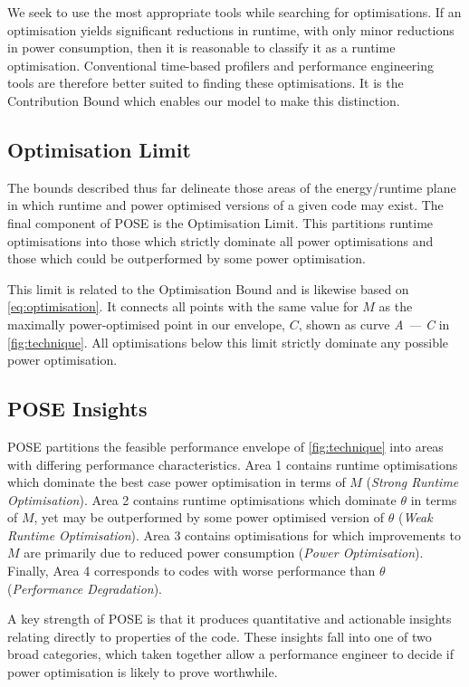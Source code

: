 We seek to use the most appropriate tools while searching for optimisations.
If an optimisation yields significant reductions in runtime, with only minor reductions in power consumption, then it is reasonable to classify it as a runtime optimisation.
Conventional time-based profilers and performance engineering tools are therefore better suited to finding these optimisations.
It is the Contribution Bound which enables our model to make this distinction.

\subsection{Optimisation Limit}
\noindent
The bounds described thus far delineate those areas of the energy/runtime plane in which runtime and power optimised versions of a given code may exist.
The final component of POSE is the Optimisation Limit.
This partitions runtime optimisations into those which strictly dominate all power optimisations and those which could be outperformed by some power optimisation.

This limit is related to the Optimisation Bound and is likewise based on \autoref{eq:optimisation}.
It connects all points with the same value for $M$ as the maximally power-optimised point in our envelope, $C$, shown as curve \emph{A --- C} in \autoref{fig:technique}.
All optimisations below this limit strictly dominate any possible power optimisation.

\subsection{POSE Insights}
\noindent

POSE partitions the feasible performance envelope of \autoref{fig:technique} into areas with differing performance characteristics.
Area 1 contains runtime optimisations which dominate the best case power optimisation in terms of $M$ (\emph{Strong Runtime Optimisation}).
Area 2 contains runtime optimisations which dominate $\theta$ in terms of $M$, yet may be outperformed by some power optimised version of $\theta$ (\emph{Weak Runtime Optimisation}).
Area 3 contains optimisations for which improvements to $M$ are primarily due to reduced power consumption (\emph{Power Optimisation}).
Finally, Area 4 corresponds to codes with worse performance than $\theta$ (\emph{Performance Degradation}).

A key strength of POSE is that it produces quantitative and actionable insights relating directly to properties of the code.
These insights fall into one of two broad categories, which taken together allow a performance engineer to decide if power optimisation is likely to prove worthwhile.

